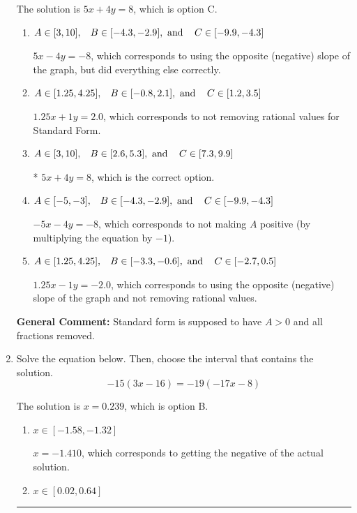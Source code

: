\documentclass{extbook}[14pt]
\newcommand{\litem}[1]{\item #1

\rule{\textwidth}{0.4pt}}
\begin{document}
\begin{enumerate}
{The solution is \( 5x + 4y = 8 \), which is option C.\begin{enumerate}[label=\Alph*.]
\item \( A \in [3, 10], \hspace{3mm} B \in [-4.3, -2.9], \text{ and } \hspace{3mm} C \in [-9.9, -4.3] \)

 $5x - 4y = -8$, which corresponds to using the opposite (negative) slope of the graph, but did everything else correctly.
\item \( A \in [1.25, 4.25], \hspace{3mm} B \in [-0.8, 2.1], \text{ and } \hspace{3mm} C \in [1.2, 3.5] \)

 $1.25x + 1y = 2.0$, which corresponds to not removing rational values for Standard Form.
\item \( A \in [3, 10], \hspace{3mm} B \in [2.6, 5.3], \text{ and } \hspace{3mm} C \in [7.3, 9.9] \)

* $5x + 4y = 8$, which is the correct option.
\item \( A \in [-5, -3], \hspace{3mm} B \in [-4.3, -2.9], \text{ and } \hspace{3mm} C \in [-9.9, -4.3] \)

 $-5x - 4y = -8$, which corresponds to not making $A$ positive (by multiplying the equation by $-1$).
\item \( A \in [1.25, 4.25], \hspace{3mm} B \in [-3.3, -0.6], \text{ and } \hspace{3mm} C \in [-2.7, 0.5] \)

 $1.25x - 1y = -2.0$, which corresponds to using the opposite (negative) slope of the graph and not removing rational values.
\end{enumerate}

\textbf{General Comment:} Standard form is supposed to have $A > 0$ and all fractions removed.
}
\litem{
Solve the equation below. Then, choose the interval that contains the solution.
\[ -15(3x -16) = -19(-17x -8) \]

The solution is \( x = 0.239 \), which is option B.\begin{enumerate}[label=\Alph*.]
\item \( x \in [-1.58, -1.32] \)

$x = -1.410$, which corresponds to getting the negative of the actual solution.
\item \( x \in [0.02, 0.64] \)


\end{enumerate}}
\end{enumerate}
\end{document}
